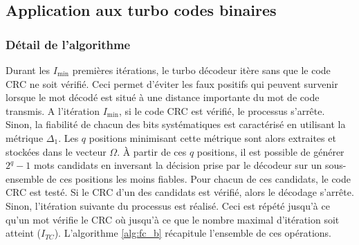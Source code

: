 \subsection{Application aux turbo codes binaires}

\subsubsection{Détail de l'algorithme}
Durant les $I_{\text{min}}$ premières itérations, le turbo décodeur itère sans que le code
CRC ne soit vérifié. Ceci permet d'éviter les faux positifs qui peuvent survenir lorsque le mot décodé est situé à une 
distance importante du mot de code transmis. A l'itération $I_{\text{min}}$, si le code CRC est vérifié, le processus
s'arrête. Sinon, la fiabilité de chacun des bits systématiques est caractérisé en utilisant la métrique $\Delta_1$.
Les $q$ positions minimisant cette métrique sont alors extraites et stockées dans le vecteur $\Omega$. À partir de ces $q$ positions,
il est possible de générer $2^q-1$ mots candidats en inversant la décision prise par le décodeur sur un sous-ensemble de 
ces positions les moins fiables. Pour chacun de ces 
candidats, le code CRC est testé. Si le CRC d'un des candidats est vérifié, alors le décodage s'arrête. Sinon, 
l'itération suivante du processus est réalisé. Ceci est répété jusqu'à ce qu'un mot vérifie le 
CRC où jusqu'à ce que le nombre maximal d'itération soit atteint ($I_{TC}$). L'algorithme \ref{alg:fc_b} récapitule l'ensemble de 
ces opérations.

